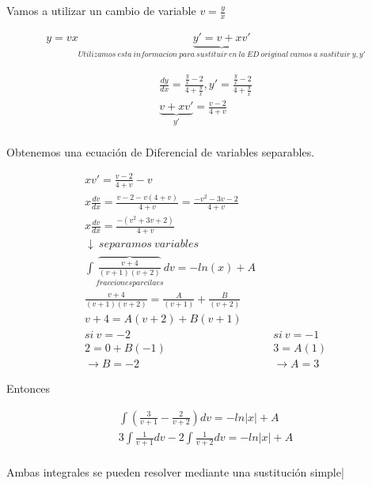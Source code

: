 \documentclass{article}
\begin{document}
Vamos a utilizar un cambio de variable $v = \frac{y}{x}$

\begin{eqnarray}
\nonumber y = vx
\nonumber  \underbrace{y'= v + xv'}_{Utilizamos \ esta \ informacion \ para \  sustituir \ en \ la \ ED \ original \ vamos \ a \ sustituir \ y,y'} 
\end{eqnarray}

\begin{eqnarray}
\nonumber \frac{dy}{dx} = \frac{\frac{y}{x} - 2}{4+ \frac{y}{x}} ,  y' = \frac{\frac{y}{x}-2}{4+ \frac{y}{x}} \\
\nonumber \underbrace{v + xv'}_{y'} = \frac{v - 2}{ 4 + v} \\
\end{eqnarray}

Obtenemos una ecuación de Diferencial de variables separables.

\begin{eqnarray}
\nonumber xv' = \frac{v-2}{4+v} -v \\
\nonumber x \frac{dv}{dx} = \frac{v-2-v \left( 4+ v \right) }{ 4 + v} = \frac{-v^2 -3v -2}{4+v} \\
\nonumber x \frac{dv}{dx} = \frac{- \left( v^2 + 3v + 2 \right)}{4+v}  \\
\nonumber \downarrow \ separamos \ variables \\
\nonumber \int \overbrace{ \frac{v + 4}{\left( v + 1  \right) \left( v + 2 \right) } }_{fracciones parcilaes}  dv = -ln \left( x \right) + A \\
\nonumber \frac{v + 4}{\left( v + 1  \right) \left( v + 2 \right) } = \frac{A}{\left( v + 1  \right)} +  \frac{B}{\left( v + 2 \right) } \\
\nonumber v+4 = A (v+2) + B (v+1) \\
si  \ v = -2  & 				& si \ v = -1 \\
2 = 0 + B(-1) &				& 3 = A(1) \\
\rightarrow B = -2 &			& \rightarrow A = 3
\end{eqnarray}


Entonces

\begin{eqnarray}
\nonumber \int \left( \frac{3}{v+1} - \frac{2}{v+2} \right) dv = -ln |x| + A \\
\nonumber 3 \int \frac{1}{v+1} dv - 2 \int \frac{1}{v+2} dv  = -ln |x| + A \\
\end{eqnarray}

Ambas integrales se pueden resolver mediante una sustitución simple|
\end{document}

